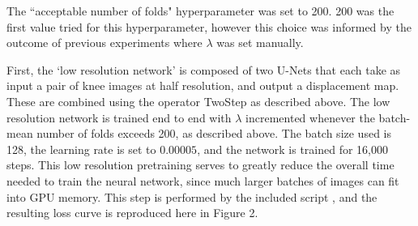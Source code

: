 The ``acceptable number of folds" hyperparameter was set to 200. 200 was the first value tried for this hyperparameter, however this choice was informed by the outcome of previous experiments where $\lambda$ was set manually. 

First, the `low resolution network' is composed of two U-Nets that each take as input a pair of knee images at half resolution, and output a displacement map. These are combined using the operator TwoStep as described above. The low resolution network is trained end to end with $\lambda$ incremented whenever the batch-mean number of folds exceeds 200, as described above. The batch size used is 128, the learning rate is set to $0.00005$, and the network is trained for 16,000 steps. This low resolution pretraining serves to greatly reduce the overall time needed to train the neural network, since much larger batches of images can fit into GPU memory. This step is performed by the included script , and the resulting loss curve is reproduced here in Figure 2.

